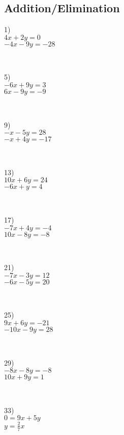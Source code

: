 \newpage

\subsection{Addition/Elimination}\par

{}
\label{matrices1}
\begin{multicols}{4}
  1)\\
	$4 x + 2 y = 0$\\
  $- 4 x - 9 y = - 28$\par
  ~\par
  5)\\
	$- 6 x + 9 y = 3$\\
  $6 x - 9 y = - 9$\par
  ~\par 
  9)\\
  $- x - 5 y = 28$\\
  $- x + 4 y = - 17$\par
  ~\par
  13)\\
  $10 x + 6 y = 24$\\
  $- 6 x + y = 4$\par
  ~\par
  17)\\
  $- 7 x + 4 y = - 4$\\
  $10 x - 8 y = - 8$\par
  ~\par
  21)\\
  $- 7 x - 3 y = 12$\\
  $- 6 x - 5 y = 20$\par
  ~\par
  25)\\
  $9 x + 6 y = - 21$\\
  $- 10 x - 9 y = 28$\par
  ~\par
  29)\\
  $- 8 x - 8 y = - 8$\\
  $10 x + 9 y = 1$\par
  ~\par
  33)\\
  $0 = 9 x + 5 y$\\
  $y = \frac{2}{7} x$\par
	~\par
	

\end{multicols}
